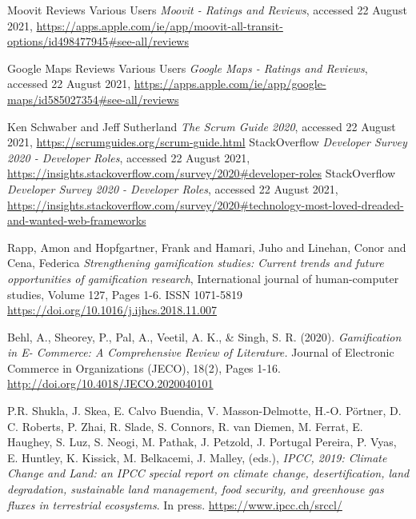 \documentclass[]{UCD_CS_47360_Report}
\begin{document}
\begin{thebibliography}{99}
 Moovit Reviews Various Users \emph{Moovit - Ratings and Reviews}, accessed 22 August 2021, \href{https://apps.apple.com/ie/app/moovit-all-transit-options/id498477945#see-all/reviews}{https://apps.apple.com/ie/app/moovit-all-transit-options/id498477945\#see-all/reviews}

 Google Maps Reviews Various Users \emph{Google Maps - Ratings and Reviews}, accessed 22 August 2021, \href{https://apps.apple.com/ie/app/google-maps/id585027354#see-all/reviews}{https://apps.apple.com/ie/app/google-maps/id585027354\#see-all/reviews}

 Ken Schwaber and Jeff Sutherland \emph{The Scrum Guide 2020}, accessed 22 August 2021, \href{https://scrumguides.org/scrum-guide.html}{https://scrumguides.org/scrum-guide.html}
 StackOverflow \emph{Developer Survey 2020 - Developer Roles}, accessed 22 August 2021, \href{https://insights.stackoverflow.com/survey/2020#developer-roles}{https://insights.stackoverflow.com/survey/2020\#developer-roles}
 StackOverflow \emph{Developer Survey 2020 - Developer Roles}, accessed 22 August 2021, \href{https://insights.stackoverflow.com/survey/2020#technology-most-loved-dreaded-and-wanted-web-frameworks}{https://insights.stackoverflow.com/survey/2020\#technology-most-loved-dreaded-and-wanted-web-frameworks}

Rapp, Amon and Hopfgartner, Frank and Hamari, Juho and Linehan, Conor and Cena, Federica \emph{Strengthening gamification studies: Current trends and future opportunities of gamification research}, International journal of human-computer studies, Volume 127, Pages 1-6. ISSN 1071-5819 \href{https://doi.org/10.1016/j.ijhcs.2018.11.007}{https://doi.org/10.1016/j.ijhcs.2018.11.007}

Behl, A., Sheorey, P., Pal, A., Veetil, A. K., & Singh, S. R. (2020). \emph{Gamification in E- Commerce: A Comprehensive Review of Literature.} Journal of Electronic Commerce in Organizations (JECO), 18(2), Pages 1-16. \href{http://doi.org/10.4018/JECO.2020040101}{http://doi.org/10.4018/JECO.2020040101}

P.R. Shukla, J. Skea, E. Calvo Buendia, V. Masson-Delmotte, H.-O. Pörtner, D. C. Roberts, P. Zhai, R. Slade, S. Connors, R. van Diemen, M. Ferrat, E. Haughey, S. Luz, S. Neogi, M. Pathak, J. Petzold, J. Portugal Pereira, P. Vyas, E. Huntley, K. Kissick, M. Belkacemi, J. Malley, (eds.), \emph{IPCC, 2019: Climate Change and Land: an IPCC special report on climate change, desertification, land degradation, sustainable land management, food security, and greenhouse gas fluxes in terrestrial ecosystems}. In press. \href{https://www.ipcc.ch/srccl/}{https://www.ipcc.ch/srccl/}


\end{thebibliography}
\end{document}
